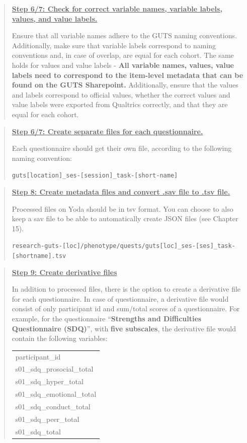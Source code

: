 \documentclass[
  letterpaper,
  DIV=11,
  numbers=noendperiod]{scrreprt}
\begin{document}
\begin{tcolorbox}
\begin{quote}
\textbf{\ul{Step 6/7: Check for correct variable names, variable labels,
values, and value labels.}}

Ensure that all variable names adhere to the GUTS naming conventions.
Additionally, make sure that variable labels correspond to naming
conventions and, in case of overlap, are equal for each cohort. The same
holds for values and value labels - \textbf{All variable names, values,
value labels need to correspond to the item-level metadata that can be
found on the GUTS Sharepoint.} Additionally, ensure that the values and
labels correspond to official values, whether the correct values and
value labels were exported from Qualtrics correctly, and that they are
equal for each cohort.
\end{quote}

\begin{quote}
\textbf{\ul{Step 6/7: Create separate files for each questionnaire.}}

Each questionnaire should get their own file, according to the following
naming convention:

\texttt{guts{[}location{]}\_ses-{[}session{]}\_task-{[}short-name{]}}
\end{quote}

\begin{quote}
\textbf{\ul{Step 8: Create metadata files and convert .sav file to .tsv
file.}}

Processed files on Yoda should be in tsv format. You can choose to also
keep a sav file to be able to automatically create JSON files (see
Chapter 15).

\texttt{research-guts-{[}loc{]}/phenotype/quests/guts{[}loc{]}\_ses-{[}ses{]}\_task-{[}shortname{]}.tsv}
\end{quote}

\begin{quote}
\textbf{\ul{Step 9: Create derivative files}}

In addition to processed files, there is the option to create a
derivative file for each questionnaire. In case of questionnaire, a
derivative file would consist of only participant id and sum/total
scores of a questionnaire. For example, for the questionnaire
``\textbf{Strengths and Difficulties Questionnaire (SDQ)}'', with
\textbf{five subscales}, the derivative file would contain the following
variables:

\begin{longtable}[]{@{}l@{}}
\toprule\noalign{}
\endhead
\bottomrule\noalign{}
\endlastfoot
participant\_id \\
s01\_sdq\_prosocial\_total \\
s01\_sdq\_hyper\_total \\
s01\_sdq\_emotional\_total \\
s01\_sdq\_conduct\_total \\
s01\_sdq\_peer\_total \\
s01\_sdq\_total \\
\end{longtable}


\end{quote}
\end{tcolorbox}
\end{document}
